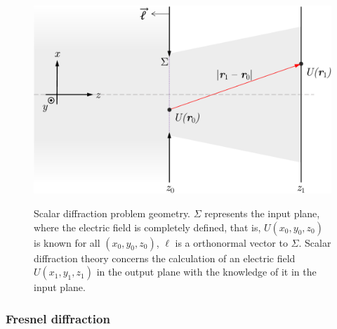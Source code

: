 \begin{refsection}
\begin{figure}[t]
    \centering
    {\includegraphics[width=.5\linewidth]{figures/ch02/diffraction_geometry.pdf}}
    \caption[Scalar diffraction problem geometry]{Scalar diffraction problem geometry. $\Sigma$ represents the input plane, where the electric field is completely defined, that is, $U(x_0, y_0, z_0)$ is known for all $(x_0, y_0, z_0)$, $\ell$ is a orthonormal vector to $\Sigma$. Scalar diffraction theory concerns the calculation of an electric field $U(x_1, y_1, z_1)$ in the output plane with the knowledge of it in the input plane.}
    \label{fig:diffraction}
\end{figure}

\subsubsection*{Fresnel diffraction}


\end{refsection}
